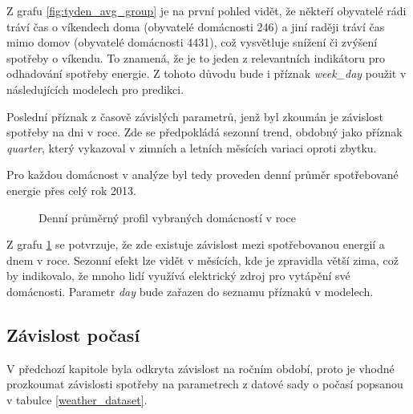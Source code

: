 \documentclass[FM,BP,fonts]{tulthesis}
\begin{document}
Z grafu \ref{fig:tyden_avg_group} je na první pohled vidět, že někteří obyvatelé rádi tráví čas o víkendech doma (obyvatelé domácnosti 246) a jiní raději tráví čas mimo domov (obyvatelé domácnosti 4431), což vysvětluje snížení či zvýšení spotřeby o víkendu. To znamená, že je to jeden z relevantních indikátoru pro odhadování spotřeby energie. Z tohoto důvodu bude i příznak \textit{week\_day} použit v následujících modelech pro predikci.

Poslední příznak z časově závislých parametrů, jenž byl zkoumán je závislost spotřeby na dni v roce. Zde se předpokládá sezonní trend, obdobný jako příznak \textit{quarter}, který vykazoval v zimních a letních měsících variaci oproti zbytku. 

Pro každou domácnost v analýze byl tedy proveden denní průměr spotřebované energie přes celý rok 2013. 

\begin{figure}[htbp]
	\centering
	\caption{Denní průměrný profil vybraných domácností v roce}
	\label{fig:year_avg_all}
\end{figure}

Z grafu \ref{fig:year_avg_all} se potvrzuje, že zde existuje závislost mezi spotřebovanou energií a dnem v roce. Sezonní efekt lze vidět v měsících, kde je zpravidla větší zima, což by indikovalo, že mnoho lidí využívá elektrický zdroj pro vytápění své domácnosti. Parametr \textit{day} bude zařazen do seznamu příznaků v modelech.

\subsection{Závislost počasí}
V předchozí kapitole byla odkryta závislost na ročním období, proto je vhodné prozkoumat závislosti spotřeby na parametrech z datové sady o počasí popsanou v tabulce \ref{weather_dataset}.
\end{document}
